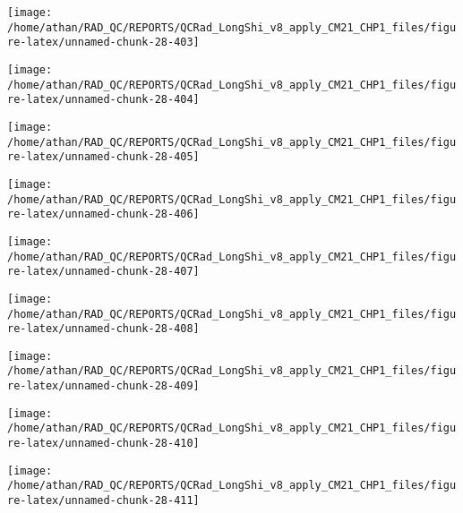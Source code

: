\documentclass[
  10pt,
  a4paper,oneside]{article}
\begin{document}
\begin{center}\texttt{[image: /home/athan/RAD\_QC/REPORTS/QCRad\_LongShi\_v8\_apply\_CM21\_CHP1\_files/figure-latex/unnamed-chunk-28-403]} \end{center}

\begin{center}\texttt{[image: /home/athan/RAD\_QC/REPORTS/QCRad\_LongShi\_v8\_apply\_CM21\_CHP1\_files/figure-latex/unnamed-chunk-28-404]} \end{center}

\begin{center}\texttt{[image: /home/athan/RAD\_QC/REPORTS/QCRad\_LongShi\_v8\_apply\_CM21\_CHP1\_files/figure-latex/unnamed-chunk-28-405]} \end{center}

\begin{center}\texttt{[image: /home/athan/RAD\_QC/REPORTS/QCRad\_LongShi\_v8\_apply\_CM21\_CHP1\_files/figure-latex/unnamed-chunk-28-406]} \end{center}

\begin{center}\texttt{[image: /home/athan/RAD\_QC/REPORTS/QCRad\_LongShi\_v8\_apply\_CM21\_CHP1\_files/figure-latex/unnamed-chunk-28-407]} \end{center}

\begin{center}\texttt{[image: /home/athan/RAD\_QC/REPORTS/QCRad\_LongShi\_v8\_apply\_CM21\_CHP1\_files/figure-latex/unnamed-chunk-28-408]} \end{center}

\begin{center}\texttt{[image: /home/athan/RAD\_QC/REPORTS/QCRad\_LongShi\_v8\_apply\_CM21\_CHP1\_files/figure-latex/unnamed-chunk-28-409]} \end{center}

\begin{center}\texttt{[image: /home/athan/RAD\_QC/REPORTS/QCRad\_LongShi\_v8\_apply\_CM21\_CHP1\_files/figure-latex/unnamed-chunk-28-410]} \end{center}

\begin{center}\texttt{[image: /home/athan/RAD\_QC/REPORTS/QCRad\_LongShi\_v8\_apply\_CM21\_CHP1\_files/figure-latex/unnamed-chunk-28-411]} \end{center}
\end{document}
